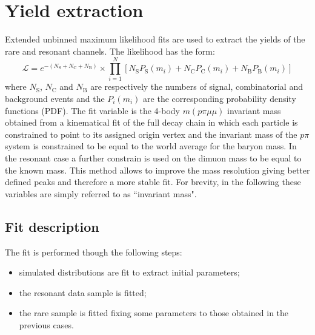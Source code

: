 \section{Yield extraction}

Extended unbinned maximum likelihood fits are used to extract the yields of the rare and resonant channels.
The likelihood has the form:
%
\begin{equation}
\mathcal{L}=e^{-(N_\mathrm{S}+N_\mathrm{C}+N_{\mathrm{B}})}\times\prod_{i=1}^{N}\left[
N_\mathrm{S}P_{\mathrm{S}}(m_i)+N_\mathrm{C}P_\mathrm{C}(m_i)+N_{\mathrm{B}}P_{\mathrm{B}}(m_i)\right]
\end{equation}
\noindent
where $N_\mathrm{S}$, $N_\mathrm{C}$ and $N_\mathrm{B}$ are respectively the numbers of signal, 
combinatorial and \KS background events and the $P_i(m_i)$ are the corresponding probability density functions (PDF).
The fit variable is the 4-body $m(p\pi\mu\mu)$ invariant mass obtained from
a kinematical fit of the full decay chain in which each particle is constrained to point to its
assigned origin vertex and the invariant mass of the $p\pi$ system is constrained to be equal to
the world average for the \Lz baryon mass. In the resonant case a further constrain is used on the dimuon
mass to be equal to the known \jpsi mass. This method allows to improve the mass resolution giving
better defined peaks and therefore a more stable fit. For brevity, in the following these variables are
simply referred to as ``invariant mass".

\subsection{Fit description}
\label{sec:Lb_fit}

The fit is performed though the following steps:
%
\begin{itemize}
\item simulated distributions are fit to extract initial parameters;
\item the resonant data sample is fitted;
\item the rare sample is fitted fixing some parameters to those obtained in the previous cases.
\end{itemize}
%

